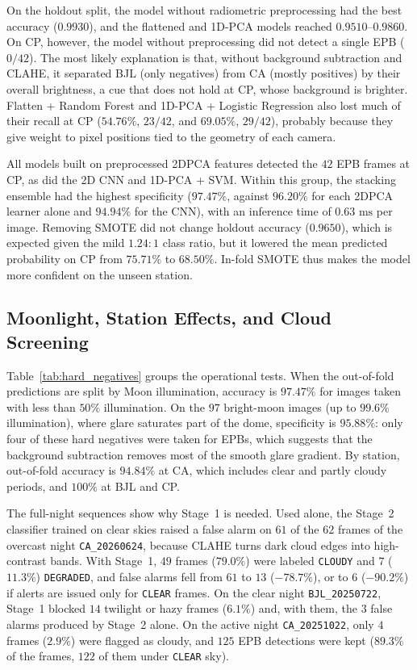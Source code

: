 On the holdout split, the model without radiometric preprocessing had the best accuracy ($0.9930$), and the flattened and 1D-PCA models reached $0.9510\text{--}0.9860$. On CP, however, the model without preprocessing did not detect a single EPB ($0/42$). The most likely explanation is that, without background subtraction and CLAHE, it separated BJL (only negatives) from CA (mostly positives) by their overall brightness, a cue that does not hold at CP, whose background is brighter. Flatten + Random Forest and 1D-PCA + Logistic Regression also lost much of their recall at CP ($54.76\%$, $23/42$, and $69.05\%$, $29/42$), probably because they give weight to pixel positions tied to the geometry of each camera.

All models built on preprocessed 2DPCA features detected the $42$ EPB frames at CP, as did the 2D CNN and 1D-PCA + SVM. Within this group, the stacking ensemble had the highest specificity ($97.47\%$, against $96.20\%$ for each 2DPCA learner alone and $94.94\%$ for the CNN), with an inference time of $0.63\text{ ms}$ per image. Removing SMOTE did not change holdout accuracy ($0.9650$), which is expected given the mild $1.24:1$ class ratio, but it lowered the mean predicted probability on CP from $75.71\%$ to $68.50\%$. In-fold SMOTE thus makes the model more confident on the unseen station.

\subsection{Moonlight, Station Effects, and Cloud Screening}

Table~\ref{tab:hard_negatives} groups the operational tests. When the out-of-fold predictions are split by Moon illumination, accuracy is $97.47\%$ for images taken with less than $50\%$ illumination. On the $97$ bright-moon images (up to $99.6\%$ illumination), where glare saturates part of the dome, specificity is $95.88\%$: only four of these hard negatives were taken for EPBs, which suggests that the background subtraction removes most of the smooth glare gradient. By station, out-of-fold accuracy is $94.84\%$ at CA, which includes clear and partly cloudy periods, and $100\%$ at BJL and CP.

The full-night sequences show why Stage~1 is needed. Used alone, the Stage~2 classifier trained on clear skies raised a false alarm on $61$ of the $62$ frames of the overcast night \texttt{CA\_20260624}, because CLAHE turns dark cloud edges into high-contrast bands. With Stage~1, $49$ frames ($79.0\%$) were labeled \texttt{CLOUDY} and $7$ ($11.3\%$) \texttt{DEGRADED}, and false alarms fell from $61$ to $13$ ($-78.7\%$), or to $6$ ($-90.2\%$) if alerts are issued only for \texttt{CLEAR} frames. On the clear night \texttt{BJL\_20250722}, Stage~1 blocked $14$ twilight or hazy frames ($6.1\%$) and, with them, the $3$ false alarms produced by Stage~2 alone. On the active night \texttt{CA\_20251022}, only $4$ frames ($2.9\%$) were flagged as cloudy, and $125$ EPB detections were kept ($89.3\%$ of the frames, $122$ of them under \texttt{CLEAR} sky).

